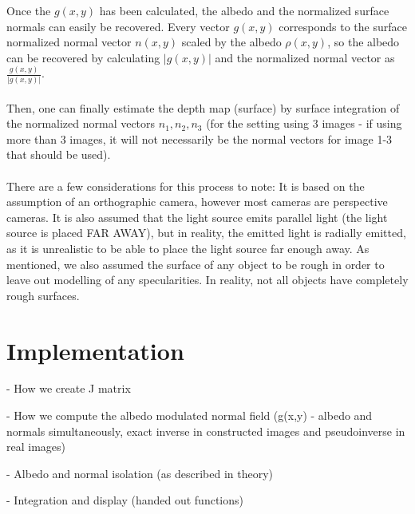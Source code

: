 \documentclass[12pt,a4paper,oneside,final]{article}
\begin{document}
Once the $g(x,y)$ has been calculated, the albedo and the normalized surface normals can easily be recovered. Every vector $g(x,y)$ corresponds to the surface normalized normal vector $n(x,y)$ scaled by the albedo $\rho(x,y)$, so the albedo can be recovered by calculating $|g(x,y)|$ and the normalized normal vector as $\frac{g(x,y)}{|g(x,y)|}$.\\\\
Then, one can finally estimate the depth map (surface) by surface integration of the normalized normal vectors $n_1, n_2, n_3$ (for the setting using 3 images - if using more than 3 images, it will not necessarily be the normal vectors for image 1-3 that should be used).\\\\
There are a few considerations for this process to note: It is based on the assumption of an orthographic camera, however most cameras are perspective cameras. It is also assumed that the light source emits parallel light (the light source is placed FAR AWAY), but in reality, the emitted light is radially emitted, as it is unrealistic to be able to place the light source far enough away. As mentioned, we also assumed the surface of any object to be rough in order to leave out modelling of any specularities. In reality, not all objects have completely rough surfaces.

\section{Implementation}

- How we create J matrix

- How we compute the albedo modulated normal field (g(x,y) - albedo and normals simultaneously, exact inverse in constructed images and pseudoinverse in real images)

- Albedo and normal isolation (as described in theory)

- Integration and display (handed out functions)
\end{document}
